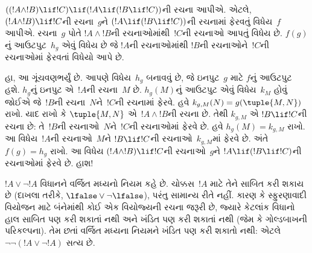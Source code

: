 \begin{ex}
$((!A \land !B) \lif !C) \lif (!A \lif (!B \lif !C))$ની
રચના આપીએ. એટલે, $(!A \land !B) \lif !C$ની રચના~$g$ને
$(!A \lif (!B \lif !C))$ની રચનામાં ફેરવતું વિધેય~$f$
આપીએ. રચના~$g$ પોતે $!A \land !B$ની રચનાઓમાંથી~$!C$ની
રચનાઓ આપતું વિધેય છે. 
$f(g)$નું આઉટપુટ~$h_g$ એવું વિધેય છે જે $!A$ની રચનાઓમાંથી
$!B$ની રચનાઓને~$!C$ની રચનાઓમાં ફેરવતાં વિધેયો આપે છે.

હા, આ ગૂંચવણભર્યું છે. આપણે વિધેય~$h_g$ બનાવવું છે, જે
ઇનપુટ~$g$ માટે $f$નું આઉટપુટ હશે. $h_g$નું ઇનપુટ એ~$!A$ની
રચના~$M$ છે. $h_g(M)$નું આઉટપુટ એવું વિધેય~$k_M$ હોવું જોઈએ
જે~$!B$ની રચના~$N$ને~$!C$ની રચનામાં ફેરવે. હવે
$k_{g,M}(N) = g(\tuple{M, N})$ રાખો. યાદ રાખો કે
$\tuple{M, N}$ એ~$!A \land !B$ની રચના છે. તેથી
$k_{g,M}$ એ $!B \lif !C$ની રચના છે: તે~$!B$ની
રચનાઓ~$N$ને~$!C$ની રચનાઓમાં ફેરવે છે. હવે
$h_g(M) = k_{g,M}$ રાખો. આ વિધેય~$!A$ની રચનાઓ~$M$ને
$!B \lif !C$ની રચનાઓ~$k_{g,M}$માં ફેરવે છે. અંતે
$f(g) = h_g$ રાખો. આ વિધેય $(!A \land !B) \lif !C$ની
રચનાઓ~$g$ને $!A \lif (!B \lif !C)$ની રચનાઓમાં ફેરવે
છે. હાશ!{}
\end{ex}

$!A \lor \lnot !A$ વિધાનને વર્જિત મધ્યનો નિયમ કહે છે.
ચોક્કસ~$!A$ માટે તેને સાબિત કરી શકાય છે (દાખલા તરીકે,
$\lfalse \lor \lnot \lfalse$), પરંતુ સામાન્ય રીતે નહીં.
કારણ કે સ્ફુરણાવાદી વિયોજન માટે બંનેમાંથી કોઈ એક વિયોજ્યની
રચના જરૂરી છે, જ્યારે કેટલાંક વિધાનો હાલ સાબિત પણ કરી શકાતાં
નથી અને ખંડિત પણ કરી શકાતાં નથી (જેમ કે ગોલ્ડબાખની પરિકલ્પના).
તેમ છતાં વર્જિત મધ્યના નિયમને ખંડિત પણ કરી શકાતો નથી:
એટલે $\lnot \lnot (!A \lor \lnot !A)$ સત્ય છે.

